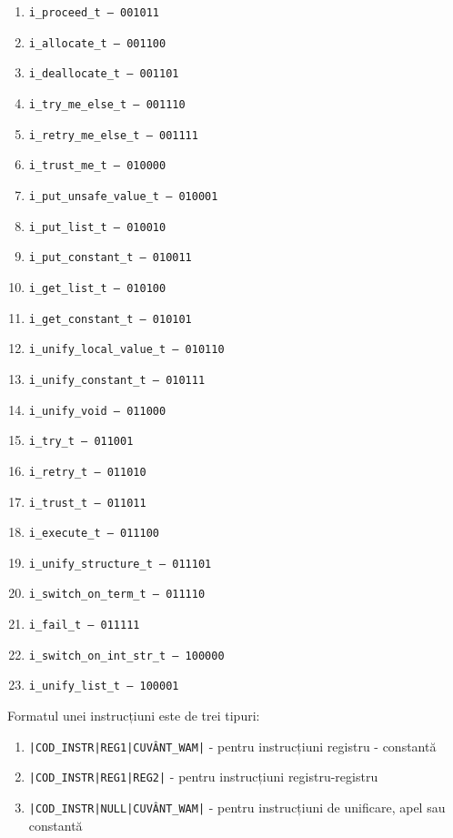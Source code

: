 \documentclass[12pt,a4paper,twoside]{report}
\begin{document}
\begin{itemize}
\begin{enumerate}
           \item \texttt{i\_proceed\_t           -- 001011}
           \item \texttt{i\_allocate\_t          -- 001100}
           \item \texttt{i\_deallocate\_t        -- 001101}
           \item \texttt{i\_try\_me\_else\_t       -- 001110}
           \item \texttt{i\_retry\_me\_else\_t     -- 001111}
           \item \texttt{i\_trust\_me\_t          -- 010000}
           \item \texttt{i\_put\_unsafe\_value\_t  -- 010001}
           \item \texttt{i\_put\_list\_t          -- 010010}
           \item \texttt{i\_put\_constant\_t      -- 010011}
           \item \texttt{i\_get\_list\_t          -- 010100}
           \item \texttt{i\_get\_constant\_t      -- 010101}
           \item \texttt{i\_unify\_local\_value\_t -- 010110}
           \item \texttt{i\_unify\_constant\_t    -- 010111}
           \item \texttt{i\_unify\_void          -- 011000}
           \item \texttt{i\_try\_t               -- 011001}
           \item \texttt{i\_retry\_t             -- 011010}
           \item \texttt{i\_trust\_t             -- 011011}
           \item \texttt{i\_execute\_t           -- 011100}
           \item \texttt{i\_unify\_structure\_t   -- 011101}
           \item \texttt{i\_switch\_on\_term\_t    -- 011110}
           \item \texttt{i\_fail\_t              -- 011111}
           \item \texttt{i\_switch\_on\_int\_str\_t -- 100000}
           \item \texttt{i\_unify\_list\_t        -- 100001}
         \end{enumerate}
         Formatul unei instrucțiuni este de trei tipuri:
            \begin{enumerate}
            \item \texttt{|COD\_INSTR|REG1|CUVÂNT\_WAM|} - pentru instrucțiuni registru - constantă
            \item \texttt{|COD\_INSTR|REG1|REG2|} - pentru instrucțiuni registru-registru
            \item \texttt{|COD\_INSTR|NULL|CUVÂNT\_WAM|} - pentru instrucțiuni de unificare, apel sau constantă
            \end{enumerate}
\end{itemize}
\end{document}
